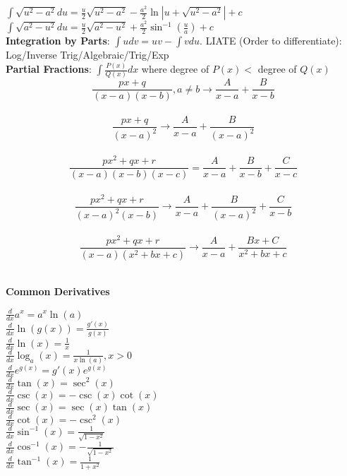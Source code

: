 \documentclass{article}
\begin{document}
\begin{multicols*}{3}
\begin{flushleft}
$\int \sqrt{u^2-a^2}du=\frac{u}{2}\sqrt{u^2-a^2}-\frac{a^2}{2}\ln|u+\sqrt{u^2-a^2}|+c$ \\
$\int \sqrt{a^2-u^2}du=\frac{u}{2}\sqrt{a^2-u^2}+\frac{a^2}{2}\sin^{-1}(\frac{u}{a})+c$ \\
\textbf{Integration by Parts}: $\int udv=uv-\int vdu$. LIATE (Order to differentiate): Log/Inverse Trig/Algebraic/Trig/Exp\\
\textbf{Partial Fractions}: $\int\frac{P(x)}{Q(x)}dx$ where degree of $P(x)<$ degree of $Q(x)$ 
\vspace{-0.1cm}$$\frac{px+q}{(x-a)(x-b)},a\not=b\to\frac{A}{x-a}+\frac{B}{x-b}$$\\
\vspace{-0.3cm}$$\frac{px+q}{(x-a)^2}\to\frac{A}{x-a}+\frac{B}{(x-a)^2}$$\\
\vspace{-0.5cm}$$\frac{px^2+qx+r}{(x-a)(x-b)(x-c)}=\frac{A}{x-a}+\frac{B}{x-b}+\frac{C}{x-c}$$\\
\vspace{-0.5cm}$$\frac{px^2+qx+r}{(x-a)^2(x-b)}\to\frac{A}{x-a}+\frac{B}{(x-a)^2}+\frac{C}{x-b}$$\\
\vspace{-0.5cm}$$\frac{px^2+qx+r}{(x-a)(x^2+bx+c)}\to\frac{A}{x-a}+\frac{Bx+C}{x^2+bx+c}$$\\
\end{flushleft}

{\centering
\textbf{Common Derivatives} \par
}
\begin{flushleft}
$\frac{d}{dx}a^x=a^x\ln(a)$\\
$\frac{d}{dx}\ln(g(x))=\frac{g'(x)}{g(x)}$\\
$\frac{d}{dx}\ln(x)=\frac{1}{x}$\\
$\frac{d}{dx}\log_a(x)=\frac{1}{x\ln(a)}, x>0$\\
$\frac{d}{dx}e^{g(x)}=g'(x)e^{g(x)}$\\
$\frac{d}{dx}\tan(x)=\sec^2(x)$\\
$\frac{d}{dx}\csc(x)=-\csc(x)\cot(x)$\\
$\frac{d}{dx}\sec(x)=\sec(x)\tan(x)$\\
$\frac{d}{dx}\cot(x)=-\csc^2(x)$\\
$\frac{d}{dx}\sin^{-1}(x)=\frac{1}{\sqrt{1-x^2}}$\\
$\frac{d}{dx}\cos^{-1}(x)=-\frac{1}{\sqrt{1-x^2}}$\\
$\frac{d}{dx}\tan^{-1}(x)=\frac{1}{1+x^2}$\\

\end{flushleft}

\end{multicols*}
\end{document}
